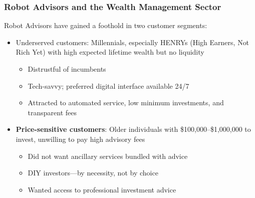 \documentclass[aspectratio=169]{beamer}
\begin{document}
\begin{frame}
\frametitle{Robot Advisors and the Wealth Management Sector}


\vspace{-2mm}
Robot Advisors have gained a foothold in two customer segments:
\medskip 

\begin{itemize}
    \item Underserved customers: Millennials, especially HENRYs (High Earners, Not Rich Yet) with high expected lifetime wealth but no liquidity 
    \begin{itemize}
        \item Distrustful of incumbents
        \item Tech-savvy; preferred digital interface available 24/7
        \item Attracted to automated service, low minimum investments, and transparent fees
    \end{itemize}
    \medskip 
    \item \textbf{Price-sensitive customers}: Older individuals with \$100,000–\$1,000,000 to invest, unwilling to pay high advisory fees
    \begin{itemize}
        \item Did not want ancillary services bundled with advice
        \item DIY investors—by necessity, not by choice
        \item Wanted access to professional investment advice
    \end{itemize}
\end{itemize}



\end{frame} 
\end{document}
